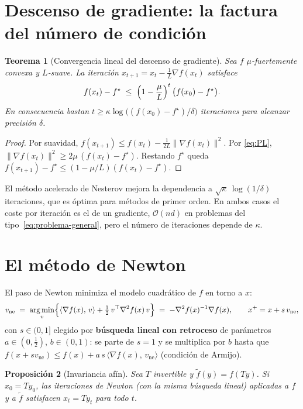 \documentclass[11pt,a4paper,oneside]{book}
\newtheorem{teorema}{Teorema}[chapter]
\newtheorem{proposicion}[teorema]{Proposición}
\theoremstyle{definition}
\theoremstyle{remark}
\newcommand{\cO}{\mathcal{O}}
\newcommand{\T}{^{\top}}
\newcommand{\nrm}[1]{\lVert #1\rVert}
\newcommand{\ip}[2]{\langle #1,\, #2\rangle}
\DeclareMathOperator*{\argmin}{arg\,min}
\newcommand{\vne}{v_{\mathrm{ne}}}
\begin{document}
\section{Descenso de gradiente: la factura del número de condición}

\begin{teorema}[Convergencia lineal del descenso de gradiente]\label{teo:gd}
Sea $f$ $\mu$-fuertemente convexa y $L$-suave. La iteración $x_{t+1}=x_t-\tfrac1L\nabla f(x_t)$ satisface
\[ f(x_t)-f^\star\;\le\;\Bigl(1-\frac{\mu}{L}\Bigr)^{t}\,\bigl(f(x_0)-f^\star\bigr). \]
En consecuencia bastan $t\ge\kappa\log\bigl((f(x_0)-f^\star)/\delta\bigr)$ iteraciones para alcanzar precisión $\delta$.
\end{teorema}

\begin{proof}
Por suavidad, $f(x_{t+1})\le f(x_t)-\tfrac{1}{2L}\nrm{\nabla f(x_t)}^2$. Por \eqref{eq:PL},
$\nrm{\nabla f(x_t)}^2\ge 2\mu\,(f(x_t)-f^\star)$. Restando $f^\star$ queda
$f(x_{t+1})-f^\star\le(1-\mu/L)(f(x_t)-f^\star)$.
\end{proof}

El método acelerado de Nesterov mejora la dependencia a $\sqrt{\kappa}\,\log(1/\delta)$ iteraciones, que es
óptima para métodos de primer orden. En ambos casos el coste por iteración es el de un gradiente,
$\cO(nd)$ en problemas del tipo~\eqref{eq:problema-general}, pero el número de iteraciones depende de $\kappa$.

\section{El método de Newton}

El paso de Newton minimiza el modelo cuadrático de $f$ en torno a $x$:
\begin{equation}\label{eq:newton-modelo}
  \vne\;=\;\argmin_{v}\Bigl\{\ip{\nabla f(x)}{v}+\tfrac12\, v\T\nabla^2 f(x)\,v\Bigr\}\;=\;-\nabla^2 f(x)^{-1}\nabla f(x),
  \qquad x^{+}=x+s\,\vne ,
\end{equation}
con $s\in(0,1]$ elegido por \textbf{búsqueda lineal con retroceso} de parámetros $a\in(0,\tfrac12)$, $b\in(0,1)$:
se parte de $s=1$ y se multiplica por $b$ hasta que $f(x+s\vne)\le f(x)+a\,s\,\ip{\nabla f(x)}{\vne}$ (condición de Armijo).

\begin{proposicion}[Invariancia afín]\label{prop:afin}
Sea $T$ invertible y $\tilde f(y)=f(Ty)$. Si $x_0=Ty_0$, las iteraciones de Newton (con la misma búsqueda lineal)
aplicadas a $f$ y a $\tilde f$ satisfacen $x_t=Ty_t$ para todo $t$.
\end{proposicion}
\end{document}
